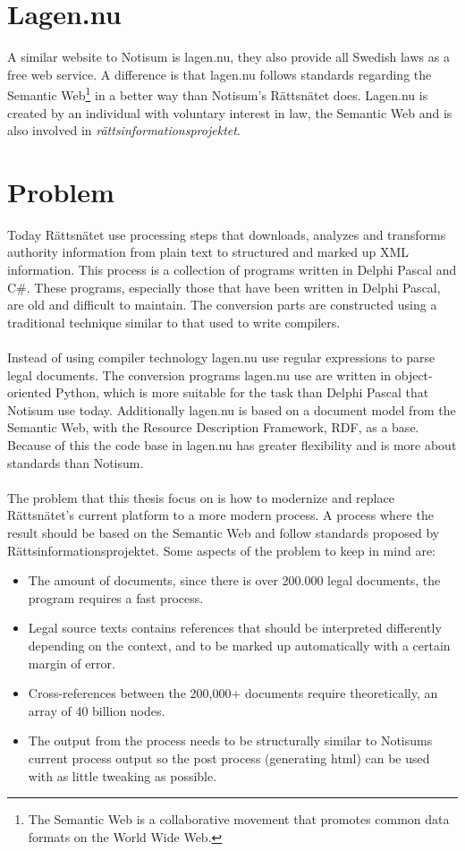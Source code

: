 \section{Lagen.nu}
A similar website to Notisum is lagen.nu, they also provide all Swedish laws as a free web service. A difference is that lagen.nu follows standards regarding the Semantic Web\footnote{The Semantic Web is a collaborative movement that promotes common data formats on the World Wide Web.} in a better way than Notisum's Rättsnätet does. Lagen.nu is created by an individual with voluntary interest in law, the Semantic Web and is also involved in \textit{rättsinformationsprojektet}. 

\section{Problem}
Today Rättsnätet use processing steps that downloads, analyzes and transforms authority information from plain text to structured and marked up XML information. This process is a collection of programs written in Delphi Pascal and C\#. These programs, especially those that have been written in Delphi Pascal, are old and difficult to maintain. The conversion parts are constructed using a traditional technique similar to that used to write compilers.\\\\
Instead of using compiler technology lagen.nu use regular expressions to parse legal documents. The conversion programs lagen.nu use are written in object-oriented Python, which is more suitable for the task than Delphi Pascal that Notisum use today. Additionally lagen.nu is based on a document model from the Semantic Web, with the Resource Description Framework, RDF, as a base. Because of this the code base in lagen.nu has greater flexibility and is more about standards than Notisum.\\\\
The problem that this thesis focus on is how to modernize and replace Rättsnätet's current platform to a more modern process. A process where the result should be based on the Semantic Web and follow standards proposed by Rättsinformationsprojektet. Some aspects of the problem to keep in mind are:
\begin{itemize} 
\item The amount of documents, since there is over 200.000 legal documents, the program requires a fast process.
\item Legal source texts contains references that should be interpreted differently depending on the context, and to be marked up automatically with a certain margin of error.
\item Cross-references between the 200,000+ documents require theoretically, an array of 40 billion nodes.
\item The output from the process needs to be structurally similar to Notisums current process output so the post process (generating html) can be used with as little tweaking as possible.
\end{itemize}

